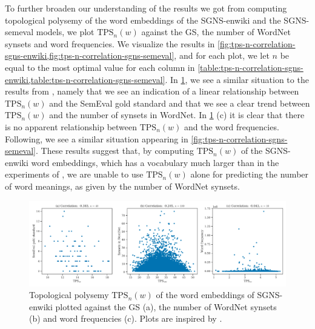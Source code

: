 To further broaden our understanding of the results we got from computing topological polysemy of the word embeddings of the SGNS-enwiki and the SGNS-semeval models, we plot $\text{TPS}_n(w)$ against the GS, the number of WordNet synsets and word frequencies. We visualize the results in \cref{fig:tps-n-correlation-sgns-enwiki,fig:tps-n-correlation-sgns-semeval}, and for each plot, we let $n$ be equal to the most optimal value for each column in \cref{table:tps-n-correlation-sgns-enwiki,table:tps-n-correlation-sgns-semeval}. In \cref{fig:tps-n-correlation-sgns-enwiki}, we see a similar situation to the results from \cite[Figures 8 and 9]{jakubowski2020topology}, namely that we see an indication of a linear relationship between $\text{TPS}_n(w)$ and the SemEval gold standard and that we see a clear trend between $\text{TPS}_n(w)$ and the number of synsets in WordNet. In \cref{fig:tps-n-correlation-sgns-enwiki} (c) it is clear that there is no apparent relationship between $\text{TPS}_n(w)$ and the word frequencies. Following, we see a similar situation appearing in \cref{fig:tps-n-correlation-sgns-semeval}. These results suggest that, by computing $\text{TPS}_n(w)$ of the SGNS-enwiki word embeddings, which has a vocabulary much larger than in the experiments of \cite{jakubowski2020topology}, we are unable to use $\text{TPS}_n(w)$ alone for predicting the number of word meanings, as given by the number of WordNet synsets.
\begin{figure}[H]
    \centering
    \includegraphics[width=\textwidth]{thesis/figures/tps-n-correlation-sgns-enwiki.pdf}
    \caption{Topological polysemy $\text{TPS}_n(w)$ of the word embeddings of SGNS-enwiki plotted against the GS (a), the number of WordNet synsets (b) and word frequencies (c). Plots are inspired by \cite[Figures 8 and 9]{jakubowski2020topology}.}
    \label{fig:tps-n-correlation-sgns-enwiki}
\end{figure}
